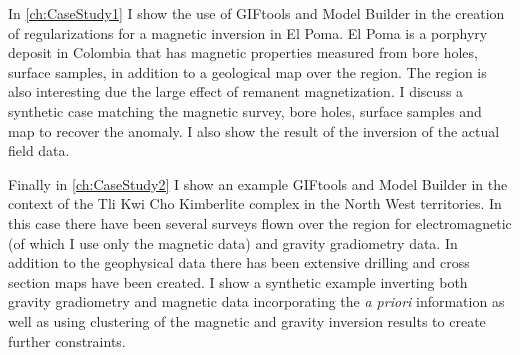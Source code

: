 In \autoref{ch:CaseStudy1} I show the use of GIFtools and Model Builder in the creation of regularizations for a magnetic inversion in El Poma. El Poma is a porphyry deposit in Colombia that has magnetic properties measured from bore holes, surface samples, in addition to a geological map over the region. The region is also interesting due the large effect of remanent magnetization. I discuss a synthetic case matching the magnetic survey, bore holes, surface samples and map to recover the anomaly. I also show the result of the inversion of the actual field data.

Finally in \autoref{ch:CaseStudy2} I show an example GIFtools and Model Builder in the context of the Tli Kwi Cho Kimberlite complex in the North West territories. In this case there have been several surveys flown over the region for electromagnetic (of which I use only the magnetic data) and gravity gradiometry data. In addition to the geophysical data there has been extensive drilling and cross section maps have been created. I show a synthetic example inverting both gravity gradiometry and magnetic data incorporating the \emph{a priori} information as well as using clustering of the magnetic and gravity inversion results to create further constraints.







\endinput

Interestingly, the assumption that all magnetizations are in the same direction also assumes that all Koenigsberger ratios are equal.

Any text after an \endinput is ignored.
You could put scraps here or things in progress.
